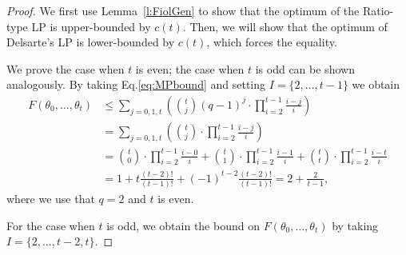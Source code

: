 \documentclass[a4paper]{article}
\begin{document}
\begin{proof}
    We first use Lemma~\ref{l:FiolGen} to show that the optimum of the Ratio-type LP is upper-bounded by $c(t)$. Then, we will show that the optimum of Delsarte's LP is lower-bounded by $c(t)$, which forces the equality.

    We prove the case when $t$ is even; the case when $t$ is odd can be shown analogously. By taking Eq.\:\eqref{eq:MPbound} and setting $I=\{2,\dots,t-1\}$ we obtain
    \begin{align*}
    F(\theta_0,\dots,\theta_t) &\leq \sum\limits_{j=0,1,t} \left( {t \choose j}(q-1)^j \cdot \prod\limits_{i=2}^{t-1}\frac{i-j}{i}\right) \\
    &= \sum\limits_{j=0,1,t} \left( {t \choose j}\cdot \prod\limits_{i=2}^{t-1}\frac{i-j}{i}\right)  \\
    &={t \choose 0}\cdot \prod\limits_{i=2}^{t-1}\frac{i-0}{i} +{t \choose 1}\cdot \prod\limits_{i=2}^{t-1}\frac{i-1}{i}+{t \choose t}\cdot \prod\limits_{i=2}^{t-1}\frac{i-t}{i} \\
    &=1+t\frac{(t-2)!}{(t-1)!}+(-1)^{t-2}\frac{(t-2)!}{(t-1)!} = 2+\frac2{t-1},\label{eq:example_RTub}
\end{align*}
where we use that $q=2$ and $t$ is even.

For the case when $t$ is odd, we obtain the bound on $F(\theta_0,\dots,\theta_t)$ by taking $I=\{2,\dots,t-2,t\}$.


\end{proof}
\end{document}
